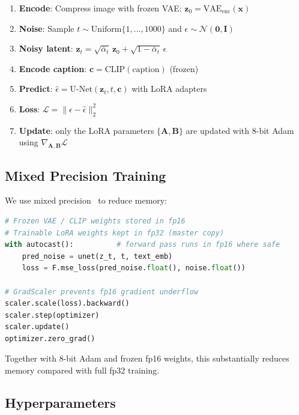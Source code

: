 \documentclass[11pt]{article}
\begin{document}
\begin{enumerate}
    \item \textbf{Encode}: Compress image with frozen VAE: $\mathbf{z}_0 = \text{VAE}_{\text{enc}}(\mathbf{x})$
    \item \textbf{Noise}: Sample $t \sim \text{Uniform}\{1, \dots, 1000\}$ and $\epsilon \sim \mathcal{N}(\mathbf{0},\mathbf{I})$
    \item \textbf{Noisy latent}: $\mathbf{z}_t = \sqrt{\bar{\alpha}_t}\, \mathbf{z}_0 + \sqrt{1-\bar{\alpha}_t}\, \epsilon$
    \item \textbf{Encode caption}: $\mathbf{c} = \text{CLIP}(\text{caption})$ (frozen)
    \item \textbf{Predict}: $\hat{\epsilon} = \text{U-Net}(\mathbf{z}_t, t, \mathbf{c})$ with LoRA adapters
    \item \textbf{Loss}: $\mathcal{L} = \|\epsilon - \hat{\epsilon}\|_2^2$
    \item \textbf{Update}: only the LoRA parameters $\{\mathbf{A}, \mathbf{B}\}$ are updated with 8-bit Adam~\cite{kingma2014adam,dettmers2022bit} using $\nabla_{\mathbf{A},\mathbf{B}} \mathcal{L}$
\end{enumerate}

\subsection{Mixed Precision Training}

We use mixed precision~\cite{micikevicius2018mixed} to reduce memory:

\begin{lstlisting}[language=Python, caption=Mixed precision setup]
# Frozen VAE / CLIP weights stored in fp16
# Trainable LoRA weights kept in fp32 (master copy)
with autocast():          # forward pass runs in fp16 where safe
    pred_noise = unet(z_t, t, text_emb)
    loss = F.mse_loss(pred_noise.float(), noise.float())

# GradScaler prevents fp16 gradient underflow
scaler.scale(loss).backward()
scaler.step(optimizer)
scaler.update()
optimizer.zero_grad()
\end{lstlisting}

Together with 8-bit Adam and frozen fp16 weights, this substantially reduces memory compared with full fp32 training.

\subsection{Hyperparameters}
\end{document}
